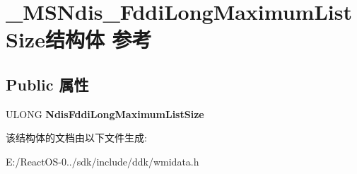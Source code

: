\hypertarget{struct___m_s_ndis___fddi_long_maximum_list_size}{}\section{\+\_\+\+M\+S\+Ndis\+\_\+\+Fddi\+Long\+Maximum\+List\+Size结构体 参考}
\label{struct___m_s_ndis___fddi_long_maximum_list_size}
\subsection*{Public 属性}
\begin{DoxyCompactItemize}
\item 
\mbox{\label{struct___m_s_ndis___fddi_long_maximum_list_size_a16dbf375387e6f2b8f0f834ddf7719dc}} 
U\+L\+O\+NG {\bfseries Ndis\+Fddi\+Long\+Maximum\+List\+Size}
\end{DoxyCompactItemize}


该结构体的文档由以下文件生成\+:\begin{DoxyCompactItemize}
\item 
E\+:/\+React\+O\+S-\/0../sdk/include/ddk/wmidata.\+h\end{DoxyCompactItemize}
